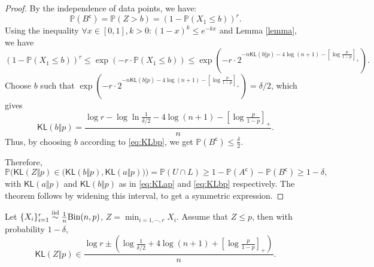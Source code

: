 \documentclass[12pt]{article}
\newcommand{\KL}{\textsf{KL}}
\newcommand{\comp}{\mathsf{c}}
\begin{document}
\begin{proof}
    By the independence of data points, we have:
    \[
    \mathbb{P}(B^\comp) = \mathbb{P}(Z > b) = (1-\mathbb{P}(X_1 \leq b))^r.
    \]
    Using the inequality $\forall x \in [0,1], k > 0: (1-x)^k \leq e^{-kx}$ and Lemma \ref{lemma}, we have
    \[
    (1-\mathbb{P}(X_1 \leq b))^r \leq \exp\left(-r \cdot \mathbb{P}(X_1 \leq b)\right) \leq \exp \left(-r \cdot 2^{-n\KL(b\Vert p) - 4\log (n+1) - \left[ \log \frac{p}{1-p} \right]_+}\right).
    \]
    Choose $b$ such that $\exp \left(-r \cdot 2^{-n\KL(b\Vert p) - 4\log (n+1) - \left[ \log \frac{p}{1-p} \right]_+}\right) = \delta/2 $, which gives
    \begin{equation} \label{eq:KLbp}
    \KL(b\Vert p) = \frac{\log r - \log \ln \frac{1}{\delta/2} - 4\log (n+1) - \left[ \log \frac{p}{1-p} \right]_+}{n}.
    \end{equation}
    Thus, by choosing $b$ according to \eqref{eq:KLbp}, we get $\mathbb{P}(B^\comp) \leq \frac{\delta}{2}$.

    Therefore,
    \begin{equation*}
        \mathbb{P}\Big(\KL(Z\Vert p) \in \big(\KL(b\Vert p), \KL(a\Vert p)\big)\Big) = \mathbb{P}(U\cap L) \geq 1 - \mathbb{P}(A^\comp) - \mathbb{P}(B^\comp) \geq 1-\delta,    
    \end{equation*}
    with $\KL(a\Vert p)$ and $\KL(b\Vert p)$ as in \eqref{eq:KLap} and \eqref{eq:KLbp} respectively. The theorem follows by widening this interval, to get a symmetric expression.
\end{proof}
\fi

\iffalse
\begin{theorem}\label{thm1}
    Let $\{X_i\}_{i = 1}^r \overset{\mathrm{iid}}{\sim} \frac{1}{n}\textnormal{Bin}(n, p)$, $Z = \min_{i = 1, \cdots, r} X_i$. Assume that $Z \leq p$, then with probability $1-\delta$,
    \[
    \KL(Z\Vert p) \in \frac{\log r \pm \left(\log \frac{1}{\delta/2} + 4\log (n+1) + \left[ \log \frac{p}{1-p} \right]_+ \right)}{n}.
    \]
\end{theorem}
\end{document}
